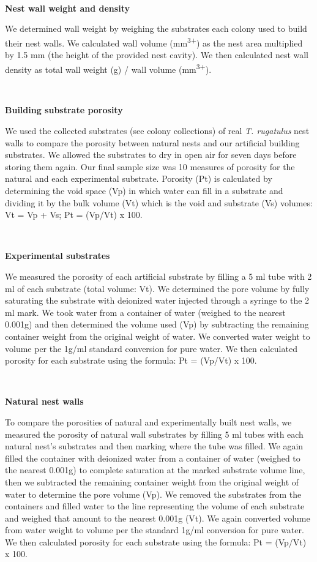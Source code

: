\documentclass[3p]{elsarticle} %
\begin{document}
~

\textbf{Nest wall weight and density}

We determined wall weight by weighing the substrates each colony used to
build their nest walls. We calculated wall volume
(mm\textsuperscript{3+}) as the nest area multiplied by 1.5 mm (the
height of the provided nest cavity). We then calculated nest wall
density as total wall weight (g) / wall volume (mm\textsuperscript{3+}).

~

\textbf{Building substrate porosity}

We used the collected substrates (see colony collections) of real
\emph{T. rugatulus} nest walls to compare the porosity between natural
nests and our artificial building substrates. We allowed the substrates
to dry in open air for seven days before storing them again. Our final
sample size was 10 measures of porosity for the natural and each
experimental substrate. Porosity (Pt) is calculated by determining the
void space (Vp) in which water can fill in a substrate and dividing it
by the bulk volume (Vt) which is the void and substrate (Vs) volumes: Vt
= Vp + Vs; Pt = (Vp/Vt) x 100.

~

\textbf{Experimental substrates}

We measured the porosity of each artificial substrate by filling a 5 ml
tube with 2 ml of each substrate (total volume: Vt). We determined the
pore volume by fully saturating the substrate with deionized water
injected through a syringe to the 2 ml mark. We took water from a
container of water (weighed to the nearest 0.001g) and then determined
the volume used (Vp) by subtracting the remaining container weight from
the original weight of water. We converted water weight to volume per
the 1g/ml standard conversion for pure water. We then calculated
porosity for each substrate using the formula: Pt = (Vp/Vt) x 100.

~

\textbf{Natural nest walls}

To compare the porosities of natural and experimentally built nest
walls, we measured the porosity of natural wall substrates by filling 5
ml tubes with each natural nest's substrates and then marking where the
tube was filled. We again filled the container with deionized water from
a container of water (weighed to the nearest 0.001g) to complete
saturation at the marked substrate volume line, then we subtracted the
remaining container weight from the original weight of water to
determine the pore volume (Vp). We removed the substrates from the
containers and filled water to the line representing the volume of each
substrate and weighed that amount to the nearest 0.001g (Vt). We again
converted volume from water weight to volume per the standard 1g/ml
conversion for pure water. We then calculated porosity for each
substrate using the formula: Pt = (Vp/Vt) x 100.
\end{document}
